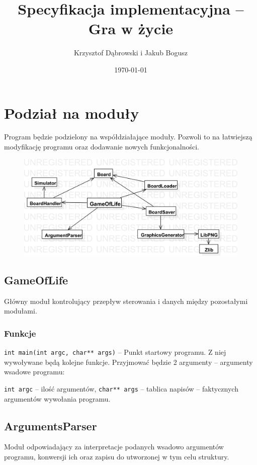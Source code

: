 \documentclass{article}
\title{Specyfikacja implementacyjna -- Gra w życie}
\author{Krzysztof Dąbrowski i Jakub Bogusz}
\date{\today}
\begin{document}
\maketitle{}

\tableofcontents{}

\section{Podział na moduły}
Program będzie podzielony na współdziałające moduły. Pozwoli to na łatwiejszą modyfikację programu oraz dodawanie nowych funkcjonalności.

\begin{figure}
	\centering
	\def\svgwidth{\columnwidth}
	\includegraphics[width=13cm]{diagram_modolow.png}
\end{figure}	

\subsection{GameOfLife}
Główny moduł kontrolujący przepływ sterowania i danych między pozostałymi modułami.

\subsubsection{Funkcje}
\texttt{int main(int argc, char** args)} -- Punkt startowy programu. Z niej wywoływane będą kolejne funkcje. Przyjmować będzie 2 argumenty -- argumenty wsadowe programu:
\begin{itemize}[label={}]
	\texttt{int argc} -- ilość argumentów,
	\texttt{char** args} -- tablica napisów -- faktycznych argumentów wywołania programu.
\end{itemize}

\subsection{ArgumentsParser}
Moduł odpowiadający za interpretacje podanych wsadowo argumentów programu, konwersji ich oraz zapisu do utworzonej w tym celu struktury.
\end{document}
